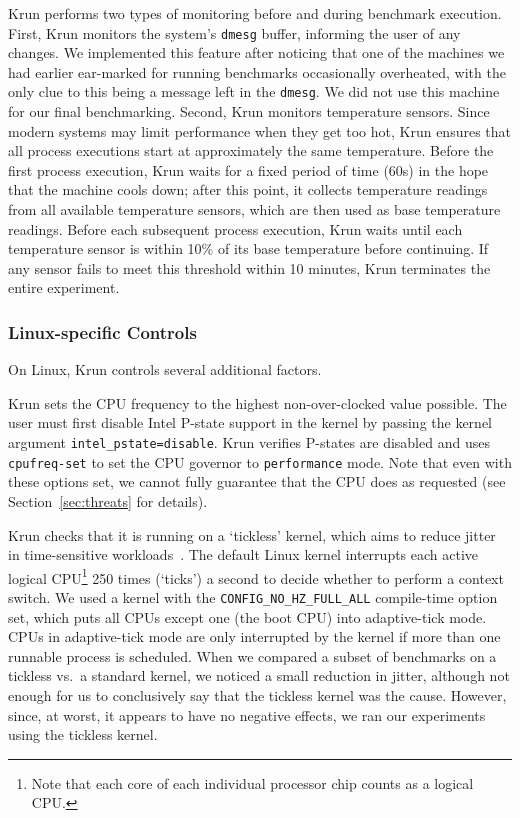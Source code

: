 \documentclass[a4paper,UKenglish]{lipics}
\newcommand{\krun}{Krun\xspace}
\begin{document}
\krun performs two types of monitoring before and during benchmark execution.
First, \krun monitors the system's \texttt{dmesg} buffer, informing the user of
any changes. We implemented this feature after noticing that one of the
machines we had earlier ear-marked for running benchmarks occasionally
overheated, with the only clue to this being a message left in the \texttt{dmesg}.
We did not use this machine for our final benchmarking.
Second, \krun monitors temperature sensors. Since modern systems may limit
performance when they get too hot, \krun ensures that all process executions
start at approximately the same temperature. Before the first process execution,
\krun waits for a fixed period of time (60s) in the hope that the machine
cools down; after this point, it collects temperature
readings from all available temperature sensors, which are then used as
base temperature readings. Before each subsequent process execution, \krun
waits until each temperature sensor is within 10\%{} of its base temperature
before continuing. If any sensor fails to meet this threshold
within 10 minutes, \krun terminates the entire experiment.


\subsubsection{Linux-specific Controls}

On Linux, \krun controls several additional factors.

\krun sets the CPU frequency to the highest non-over-clocked value possible.
The user must first disable Intel P-state support in
the kernel by passing the kernel argument \texttt{intel\_pstate=disable}.
\krun verifies P-states are disabled and uses \texttt{cpufreq-set} to set
the CPU governor to \texttt{performance} mode. Note that even with these
options set, we cannot fully guarantee that the CPU does as requested
(see Section~\ref{sec:threats} for details).

\krun checks that it is running on a `tickless' kernel, which aims to reduce
jitter in time-sensitive workloads~\cite{tickless}. The default
Linux kernel interrupts each active logical CPU\footnote{Note that each core of
each individual processor chip counts as a logical CPU.} 250 times (`ticks') a second to
decide whether to perform a context switch. We used a kernel with the
\texttt{CONFIG\_NO\_HZ\_FULL\_ALL} compile-time option set, which puts
all CPUs except one (the boot CPU) into adaptive-tick mode.
CPUs in adaptive-tick mode are only interrupted by the kernel if more than
one runnable process is scheduled.
When we compared a subset of benchmarks on a tickless vs.~a standard
kernel, we noticed a small reduction in jitter, although not enough for us to
conclusively say that the tickless kernel was the cause. However,
since, at worst, it appears to have no negative effects, we ran our experiments
using the tickless kernel.
\end{document}
